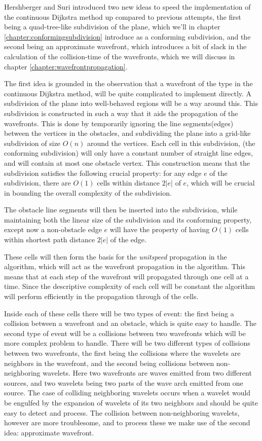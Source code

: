 Hershberger and Suri introduced two new ideas to speed the implementation of the
continuous Dijkstra method up compared to previous attempts, the first being a 
quad-tree-like subdivision of the plane, which we'll in chapter \ref{chapter:conformingsubdivision} 
introduce as a conforming subdivision, and the second being an approximate wavefront, which introduces a
bit of slack in the calculation of the collision-time of the wavefronts, which 
we will discuss in chapter \ref{chapter:wavefrontpropagation}.

The first idea is grounded in the observation that a wavefront of the type in the 
continuous Dijkstra method, will be quite complicated to implement directly. 
A subdivision of the plane into well-behaved regions will be a way around this. 
This subdivision is constructed in such a way that it aids the propagation of the 
wavefronts. This is done by temporarily ignoring the line segments(edges) between the 
vertices in the obstacles, and subdividing the plane into a grid-like subdivision of 
size $O(n)$ around the vertices. Each cell in this subdivision, (the conforming 
subdivision) will only have a constant number of straight line edges, and will contain 
at most one obstacle vertex. This construction means that the subdivision satisfies the 
following crucial property: for any edge $e$ of the subdivision, there are $O(1)$ cells 
within distance $2|e|$ of $e$, which will be crucial in bounding the overall complexity
of the subdivision.

The obstacle line segments will then be inserted into the subdivision, while
maintaining both the linear size of the subdivision and its conforming property, except 
now a non-obstacle edge $e$ will have the property of having $O(1)$ cells within 
shortest path distance $2|e|$ of the edge.

These cells will then form the basis for the \textit{unitspeed} propagation in the 
algorithm, which will act as the wavefront propagation in the algorithm. This means 
that at each step of the wavefront will propagated through one cell at a time. 
Since the descriptive complexity of each cell will be constant the 
algorithm will perform efficiently in the propagation through of the cells.

Inside each of these cells there will be two types of event: the first being a
collision between a wavefront and an obstacle, which is quite easy to handle. The 
second type of event will be a collisions between two wavefronts which will be more 
complex problem to handle. There will be two different types of collisions between two 
wavefronts, the first being the collisions where the wavelets are neighbors in the 
wavefront, and the second being collisions between non-neighboring wavelets. Here two 
wavefronts are waves emitted from two different sources, and two wavelets being two 
parts of the wave arch emitted from one source. The case of colliding neighboring 
wavelets occurs when a wavelet would be engulfed by the expansion of wavelets of its 
two neighbors and should be quite easy to detect and process. The collision between 
non-neighboring wavelets, however are more troublesome, and to process these we make 
use of the second idea: approximate wavefront.

